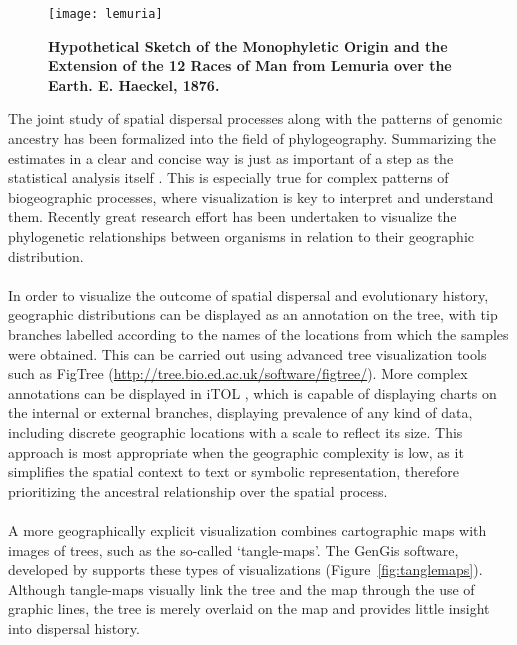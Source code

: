 \begin{figure}[H]
\centering
\texttt{[image: lemuria]}
\caption{
{ \footnotesize 
{\bf Hypothetical Sketch of the Monophyletic Origin and the Extension of the 12 Races of Man from Lemuria over the Earth. E. Haeckel, 1876.} 
} %
}
\label{fig:lemuria}
\end{figure}


The joint study of spatial dispersal processes along with the patterns of genomic ancestry has been formalized into the field of phylogeography.
Summarizing the estimates in a clear and concise way is just as important of a step as the statistical analysis itself \citep{Hadley2010}.
This is especially true for complex patterns of biogeographic processes, where visualization is key to interpret and understand them. 
Recently great research effort has been undertaken to visualize the phylogenetic relationships between organisms in relation to their geographic distribution. 

\paragraph{}
In order to visualize the outcome of spatial dispersal and evolutionary history, geographic distributions can be displayed as an annotation on the tree, with tip branches labelled according to the names of the locations from which the samples were obtained.
This can be carried out using advanced tree visualization tools such as FigTree (\url{http://tree.bio.ed.ac.uk/software/figtree/}).
More complex annotations can be displayed in iTOL \citep{itol}, which is capable of displaying charts on the internal or external branches, displaying prevalence of any kind of data, including discrete geographic locations with a scale to reflect its size.
This approach is most appropriate when the geographic complexity is low, as it simplifies the spatial context to text or symbolic representation, therefore prioritizing the ancestral relationship over the spatial process.

\paragraph{}
A more geographically explicit visualization combines cartographic maps with images of trees, such as the so-called `tangle-maps'.
The GenGis software, developed by \cite{Parks2009} supports these types of visualizations (Figure~\ref{fig:tanglemaps}).
Although tangle-maps visually link the tree and the map through the use of graphic lines, the tree is merely overlaid on the map and provides little insight into dispersal history.

